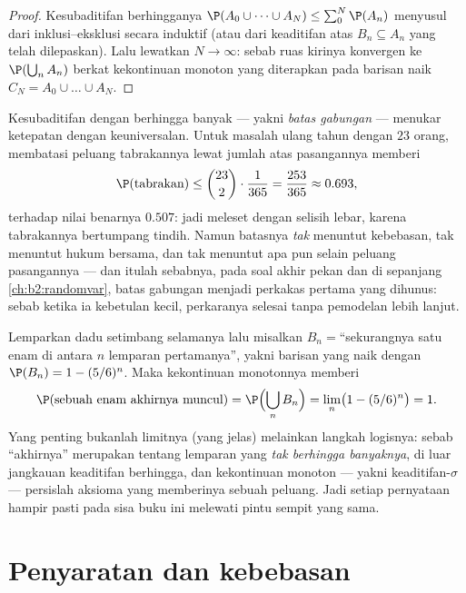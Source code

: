 \begin{proof}
Kesubaditifan berhingganya $\P(A_0 \cup \dots \cup A_N) \leq
\sum_0^N \P(A_n)$ menyusul dari inklusi--eksklusi secara induktif
(atau dari keaditifan atas $B_n \subseteq A_n$ yang telah dilepaskan).
Lalu lewatkan $N \to \infty$: sebab ruas kirinya konvergen ke
$\P(\bigcup_n A_n)$ berkat kekontinuan monoton yang diterapkan pada
barisan naik $C_N = A_0 \cup \dots \cup A_N$.
\end{proof}

\begin{example}\label{ex:b2:proba:unionbound}
Kesubaditifan dengan berhingga banyak  --- yakni \emph{batas
gabungan} --- menukar ketepatan dengan keuniversalan. Untuk
masalah ulang tahun dengan $23$ orang, membatasi peluang
tabrakannya lewat jumlah atas pasangannya memberi
\[
\P(\text{tabrakan}) \leq \binom{23}2\cdot\frac1{365}
= \frac{253}{365} \approx 0.693 ,
\]
terhadap nilai benarnya $0.507$: jadi meleset dengan selisih lebar, karena
tabrakannya bertumpang tindih. Namun batasnya \emph{tak} menuntut
kebebasan, tak menuntut hukum bersama, dan tak menuntut apa pun selain peluang
pasangannya --- dan itulah sebabnya, pada soal akhir pekan dan
di sepanjang \cref{ch:b2:randomvar}, batas gabungan menjadi
perkakas pertama yang dihunus: sebab ketika ia kebetulan kecil, perkaranya
selesai tanpa pemodelan lebih lanjut.
\end{example}

\begin{example}\label{ex:b2:proba:sixeventually}
Lemparkan dadu setimbang selamanya lalu misalkan $B_n = {}$``sekurangnya satu enam
di antara $n$ lemparan pertamanya'', yakni barisan  yang naik
dengan $\P(B_n) = 1 - (5/6)^n$. Maka kekontinuan monotonnya memberi
\[
\P(\text{sebuah enam akhirnya muncul})
= \P\Bigl(\bigcup_nB_n\Bigr)
= \lim_n\bigl(1 - (5/6)^n\bigr) = 1 .
\]
Yang penting bukanlah limitnya (yang jelas) melainkan langkah logisnya:
sebab ``akhirnya'' merupakan  tentang lemparan yang \emph{tak
berhingga banyaknya}, di luar jangkauan keaditifan berhingga, dan kekontinuan
monoton --- yakni keaditifan-$\sigma$ --- persislah
aksioma yang memberinya sebuah peluang. Jadi setiap pernyataan hampir
pasti pada sisa buku ini melewati pintu sempit yang sama.
\end{example}

\section{Penyaratan dan kebebasan}

